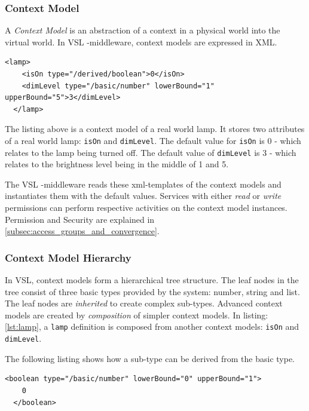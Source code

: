 \subsubsection{Context Model}
\label{subsubsec:context_model}

A \emph{Context Model} is an abstraction of a context in a physical world into the virtual world. In VSL \si{\micro}-middleware, context models are expressed in XML.

\begin{lstlisting}[caption=A context model of a lamp., label=lst:lamp]
  <lamp>
    <isOn type="/derived/boolean">0</isOn>
    <dimLevel type="/basic/number" lowerBound="1" upperBound="5">3</dimLevel>
  </lamp>
\end{lstlisting}

The listing above is a context model of a real world lamp. It stores two attributes of a real world lamp: \texttt{isOn} and \texttt{dimLevel}. The default value for \texttt{isOn} is 0 - which relates to the lamp being turned off. The default value of \texttt{dimLevel} is 3 - which relates to the brightness level being in the middle of 1 and 5.

The VSL \si{\micro}-middleware reads these xml-templates of the context models and instantiates them with the default values. Services with either \emph{read} or \emph{write} permissions can perform respective activities on the context model instances. Permission and Security are explained in \ref{subsec:access_groups_and_convergence}.

\subsubsection{Context Model Hierarchy}

In VSL, context models form a hierarchical tree structure. The leaf nodes in the tree consist of three basic types provided by the system: number, string and list. The leaf nodes are \emph{inherited} to create complex sub-types. Advanced context models are created by \emph{composition} of simpler context models. In listing: \ref{lst:lamp}, a \texttt{lamp} definition is composed from another context models: \texttt{isOn} and \texttt{dimLevel}.

The following listing shows how a sub-type can be derived from the basic type.

\begin{lstlisting}[caption=Type inheritence: Sub type boolean is derived from /basic/number.]
  <boolean type="/basic/number" lowerBound="0" upperBound="1">
    0
  </boolean>
\end{lstlisting}

